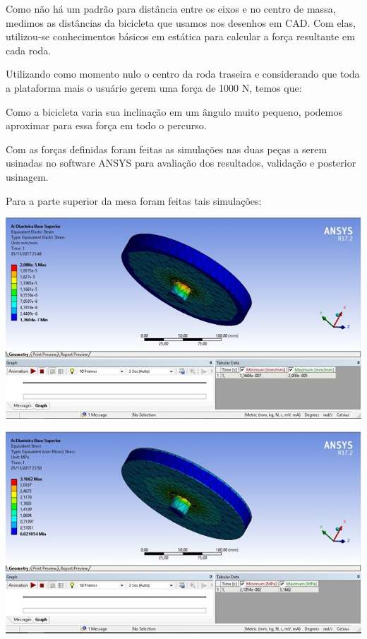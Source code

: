     Como não há um padrão para distância entre os eixos e no centro de massa, medimos as distâncias da bicicleta que usamos nos desenhos em CAD. Com elas, utilizou-se conhecimentos básicos em estática para calcular a força resultante em cada roda. 

    Utilizando como momento nulo o centro da roda traseira e considerando que toda a plataforma mais o usuário gerem uma força de 1000 N, temos que:


    Como a bicicleta varia sua inclinação em um ângulo muito pequeno, podemos aproximar para essa força em todo o percurso.

    Com as forças definidas foram feitas as simulações nas duas peças a serem usinadas no software ANSYS para avaliação dos resultados, validação e posterior usinagem.

    Para a parte superior da mesa foram feitas tais simulações:

     \begin{center}
    	\includegraphics[scale=0.7]{figuras/sim_estatica_1}
        \label{sim_estatica_1}
    \end{center}

    
     \begin{center}
    	\includegraphics[scale=0.7]{figuras/stress_1}
        \label{stress_1}
    \end{center}
   
